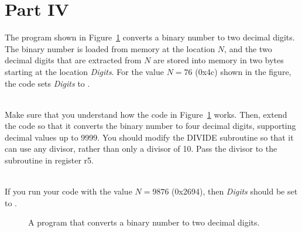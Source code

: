 \documentclass[epsfig,10pt,fullpage]{article}
\newcommand{\CommonDocsPath}{../../../../common/docs}
\begin{document}
\section*{Part IV}
The program shown in Figure~\ref{fig:decimal} converts a binary number to two decimal digits.
The binary number is loaded from memory at the location $N$, and the two
decimal digits that are extracted from $N$ are stored into memory in two bytes starting at 
the location {\it Digits}. For the value $N = 76$ ({\sf 0x4c}) shown in the figure, the code sets {\it Digits} to {}.

~\\
Make sure that you understand how the code in Figure~\ref{fig:decimal} works. Then, extend
the code so that it converts the binary number to four decimal digits, supporting decimal 
values up to 9999. You should modify the DIVIDE subroutine so that it can use any divisor, 
rather than only a divisor of 10. Pass the divisor to the subroutine in register r5.

~\\
If you run your code with the value $N = 9876$ ({\sf0x2694}), then {\it Digits} should be set to 
{}.

\begin{figure}[H]
\begin{center}
\begin{minipage}[t]{16.5 cm}

\end{minipage}
\end{center}
\caption{A program that converts a binary number to two decimal digits.}
\label{fig:decimal}
\end{figure}



\end{document}
